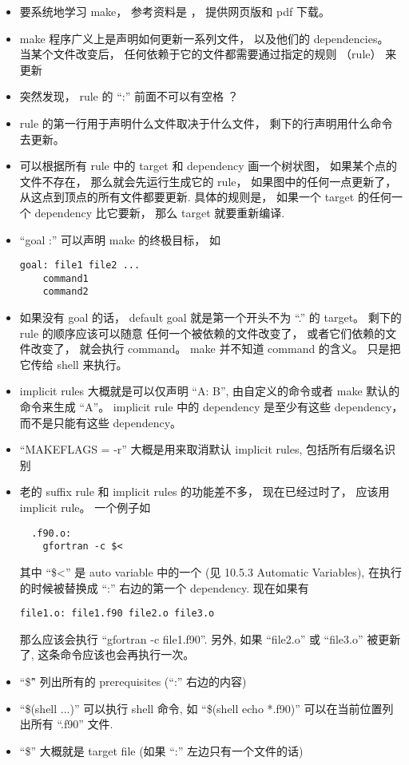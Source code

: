 

\begin{itemize}
\item 要系统地学习 make， 参考资料是 ， 提供网页版和 pdf 下载。
\item make 程序广义上是声明如何更新一系列文件， 以及他们的 dependencies。 当某个文件改变后， 任何依赖于它的文件都需要通过指定的规则 （rule） 来更新
\item 突然发现， rule 的 “:” 前面不可以有空格 ？
\item rule 的第一行用于声明什么文件取决于什么文件， 剩下的行声明用什么命令去更新。
\item 可以根据所有 rule 中的 target 和 dependency 画一个树状图， 如果某个点的文件不存在， 那么就会先运行生成它的 rule， 如果图中的任何一点更新了， 从这点到顶点的所有文件都要更新. 具体的规则是， 如果一个 target 的任何一个 dependency 比它要新， 那么 target 就要重新编译.
\item “goal :” 可以声明 make 的终极目标， 如
\begin{lstlisting}
goal: file1 file2 ...
	command1
	command2
\end{lstlisting}
\item 如果没有 goal 的话， default goal 就是第一个开头不为 “.” 的 target。 剩下的 rule 的顺序应该可以随意
任何一个被依赖的文件改变了， 或者它们依赖的文件改变了， 就会执行 command。 make 并不知道 command 的含义。 只是把它传给 shell 来执行。
\item implicit rules 大概就是可以仅声明 “A: B”, 由自定义的命令或者 make 默认的命令来生成 “A”。 implicit rule 中的 dependency 是至少有这些 dependency， 而不是只能有这些 dependency。
\item “MAKEFLAGS = -r” 大概是用来取消默认 implicit rules, 包括所有后缀名识别
\item 老的 suffix rule 和 implicit rules 的功能差不多， 现在已经过时了， 应该用 implicit rule。 一个例子如
\begin{lstlisting}
  .f90.o:
	gfortran -c $<
\end{lstlisting}
其中 “\$<” 是 auto variable 中的一个 (见 10.5.3 Automatic Variables), 在执行的时候被替换成 “:” 右边的第一个 dependency. 现在如果有
\begin{lstlisting}
file1.o: file1.f90 file2.o file3.o
\end{lstlisting}
那么应该会执行 “gfortran -c file1.f90”. 另外, 如果 “file2.o” 或 “file3.o” 被更新了, 这条命令应该也会再执行一次。
\item “\$\^” 列出所有的 prerequisites (“:” 右边的内容)
\item “\$(shell ...)” 可以执行 shell 命令, 如 “\$(shell echo *.f90)” 可以在当前位置列出所有 “.f90” 文件.
\item “\$\@” 大概就是 target file (如果 “:” 左边只有一个文件的话)
\end{itemize}
